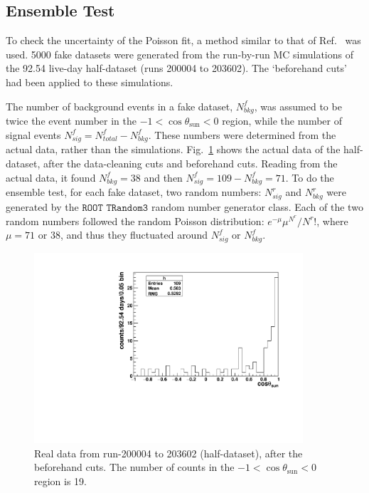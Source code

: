 \subsection{Ensemble Test}\label{sect:ensemble}

To check the uncertainty of the Poisson fit, a method similar to that of Ref.~\cite{leta} was used. 5000 fake datasets were generated from the run-by-run MC simulations of the 92.54 live-day half-dataset (runs 200004 to 203602). The `beforehand cuts' had been applied to these simulations.

The number of background events in a fake dataset, $N^f_{bkg}$, was assumed to be twice the event number in the $-1<\cos\theta_\mathrm{sun}<0$ region, while the number of signal events $N^f_{sig}=N^f_{total}-N^f_{bkg}$. These numbers were determined from the actual data, rather than the simulations. Fig.~\ref{half_data} shows the actual data of the half-dataset, after the data-cleaning cuts and beforehand cuts. Reading from the actual data, it found $N^f_{bkg}=38$ and then $N^f_{sig}=109-N^f_{bkg}=71$. To do the ensemble test, for each fake dataset, two random numbers: $N^r_{sig}$ and $N^r_{bkg}$ were generated by the $\texttt{ROOT TRandom3}$ random number generator class. Each of the two random numbers followed the random Poisson distribution: $e^{-\mu}\mu^{N^r}/N^r!$, where $\mu=71$ or $38$, and thus they fluctuated around $N^f_{sig}$ or $N^f_{bkg}$.

\begin{figure}[!htb]
	\centering
	\includegraphics[width=10cm]{cosThetaToSun_halfData_5to15.pdf}
	\caption[Real data from run-200004 to 203602 (half-dataset), after the beforehand cuts.]{Real data from run-200004 to 203602 (half-dataset), after the beforehand cuts. The number of counts in the $-1<\cos\theta_\mathrm{sun}<0$ region is 19. \label{half_data}}
\end{figure}

